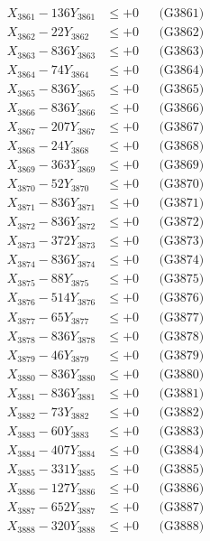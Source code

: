 \documentclass[a4paper,10pt]{article}
\begin{document}
{\begin{align}
\allowbreak
X_{3861} - 136Y_{3861} &\leq +0 && \text{(G3861)} \\
X_{3862} - 22Y_{3862} &\leq +0 && \text{(G3862)} \\
X_{3863} - 836Y_{3863} &\leq +0 && \text{(G3863)} \\
X_{3864} - 74Y_{3864} &\leq +0 && \text{(G3864)} \\
X_{3865} - 836Y_{3865} &\leq +0 && \text{(G3865)} \\
X_{3866} - 836Y_{3866} &\leq +0 && \text{(G3866)} \\
X_{3867} - 207Y_{3867} &\leq +0 && \text{(G3867)} \\
X_{3868} - 24Y_{3868} &\leq +0 && \text{(G3868)} \\
X_{3869} - 363Y_{3869} &\leq +0 && \text{(G3869)} \\
X_{3870} - 52Y_{3870} &\leq +0 && \text{(G3870)} \\
\allowbreak
X_{3871} - 836Y_{3871} &\leq +0 && \text{(G3871)} \\
X_{3872} - 836Y_{3872} &\leq +0 && \text{(G3872)} \\
X_{3873} - 372Y_{3873} &\leq +0 && \text{(G3873)} \\
X_{3874} - 836Y_{3874} &\leq +0 && \text{(G3874)} \\
X_{3875} - 88Y_{3875} &\leq +0 && \text{(G3875)} \\
X_{3876} - 514Y_{3876} &\leq +0 && \text{(G3876)} \\
X_{3877} - 65Y_{3877} &\leq +0 && \text{(G3877)} \\
X_{3878} - 836Y_{3878} &\leq +0 && \text{(G3878)} \\
X_{3879} - 46Y_{3879} &\leq +0 && \text{(G3879)} \\
X_{3880} - 836Y_{3880} &\leq +0 && \text{(G3880)} \\
\allowbreak
X_{3881} - 836Y_{3881} &\leq +0 && \text{(G3881)} \\
X_{3882} - 73Y_{3882} &\leq +0 && \text{(G3882)} \\
X_{3883} - 60Y_{3883} &\leq +0 && \text{(G3883)} \\
X_{3884} - 407Y_{3884} &\leq +0 && \text{(G3884)} \\
X_{3885} - 331Y_{3885} &\leq +0 && \text{(G3885)} \\
X_{3886} - 127Y_{3886} &\leq +0 && \text{(G3886)} \\
X_{3887} - 652Y_{3887} &\leq +0 && \text{(G3887)} \\
X_{3888} - 320Y_{3888} &\leq +0 && \text{(G3888)} \\

\end{align}}
\end{document}
